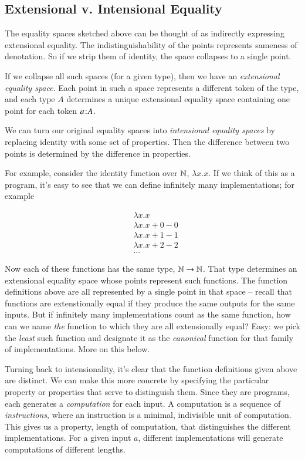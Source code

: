 \documentclass{article}
\begin{document}
\subsection{Extensional v. Intensional Equality}

The equality spaces sketched above can be thought of as indirectly
expressing extensional equality. The indistinguishability of the
points represents sameness of denotation. So if we strip them of
identity, the space collapses to a single point.

If we collapse all such spaces (for a given type), then we have an
\textit{extensional equality space}. Each point in such a space
represents a different token of the type, and each type \(A\)
determines a unique extensional equality space containing one point
for each token \(a\hspace{1pt}\mathpunct{:}\hspace{-1pt}A\).

We can turn our original equality spaces into \textit{intensional
  equality spaces} by replacing identity with some set of properties.
Then the difference between two points is determined by the difference
in properties.

For example, consider the identity function over \(\mathbb{N}\), \(\lambda
x.x\). If we think of this as a program, it's easy to see that we can
define infinitely many implementations; for example

\begin{align}
  & \lambda x.x \label{natid:lfp} \\
  & \lambda x.x + 0 - 0 \\
  & \lambda x.x + 1 - 1 \label{natid:1} \\
  & \lambda x.x + 2 - 2 \label{natid:2} \\
  & ... \nonumber
\end{align}

Now each of these functions has the same type, \(\mathbb{N}\rightarrow\mathbb{N}\). That
type determines an extensional equality space whose points represent
such functions. The function definitions above are all represented by
a single point in that space -- recall that functions are
extenstionally equal if they produce the same outputs for the same
inputs. But if infinitely many implementations count as the same
function, how can we name \textit{the} function to which they are all
extensionally equal? Easy: we pick the \textit{least} such function and
designate it as the \textit{canonical} function for that family of
implementations. More on this below.

Turning back to intensionality, it's clear that the function
definitions given above are distinct. We can make this more concrete
by specifying the particular property or properties that serve to
distinguish them. Since they are programs, each generates a
\textit{computation} for each input. A computation is a sequence of
\textit{instructions}, where an instruction is a minimal, indivisible
unit of computation. This gives us a property, length of computation,
that distinguishes the different implementations. For a given input
\(a\), different implementations will generate computations of
different lengths.
\end{document}
